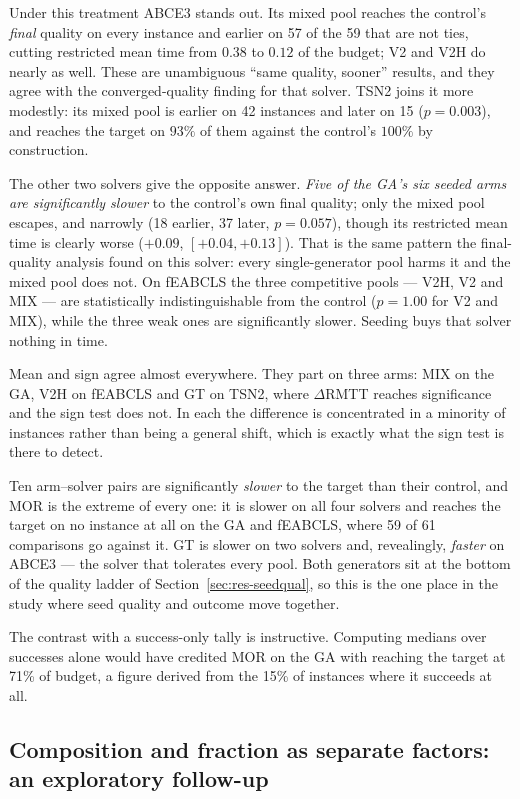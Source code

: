 \documentclass[review]{elsarticle}
\begin{document}
Under this treatment ABCE3 stands out. Its mixed pool reaches the control's
\emph{final} quality on every instance and earlier on 57 of the 59 that are
not ties, cutting restricted mean time from $0.38$ to $0.12$ of the budget;
V2 and V2H do nearly as well. These are unambiguous ``same quality,
sooner'' results, and they agree with the converged-quality finding for
that solver. TSN2 joins it more modestly: its mixed pool is earlier on 42
instances and later on 15 ($p=0.003$), and reaches the target on $93\%$ of
them against the control's $100\%$ by construction.

The other two solvers give the opposite answer. \emph{Five of the GA's six
seeded arms are significantly slower} to the control's own final quality;
only the mixed pool escapes, and narrowly (18 earlier, 37 later,
$p=0.057$), though its restricted mean time is clearly worse ($+0.09$,
$[+0.04,+0.13]$). That is the same pattern the final-quality analysis found
on this solver: every single-generator pool harms it and the mixed pool
does not. On fEABCLS the three competitive pools --- V2H, V2 and MIX ---
are statistically indistinguishable from the control ($p=1.00$ for V2 and
MIX), while the three weak ones are significantly slower. Seeding buys that
solver nothing in time.

Mean and sign agree almost everywhere. They part on three arms: MIX on the
GA, V2H on fEABCLS and GT on TSN2, where $\Delta$RMTT reaches significance
and the sign test does not. In each the difference is concentrated in a
minority of instances rather than being a general shift, which is exactly
what the sign test is there to detect.

Ten arm--solver pairs are significantly \emph{slower} to the target than
their control, and MOR is the extreme of every one: it is slower on all
four solvers and reaches the target on no instance at all on the GA and
fEABCLS, where 59 of 61 comparisons go against it. GT is slower on two
solvers and, revealingly, \emph{faster} on ABCE3 --- the solver that
tolerates every pool. Both generators sit at the bottom of the quality
ladder of Section~\ref{sec:res-seedqual}, so this is the one place in the
study where seed quality and outcome move together.

The contrast with a success-only tally is instructive. Computing medians
over successes alone would have credited MOR on the GA with reaching the
target at 71\% of budget, a figure derived from the 15\% of instances where
it succeeds at all.

\subsection{Composition and fraction as separate factors: an exploratory
follow-up}\label{sec:res-fraction}
\end{document}
